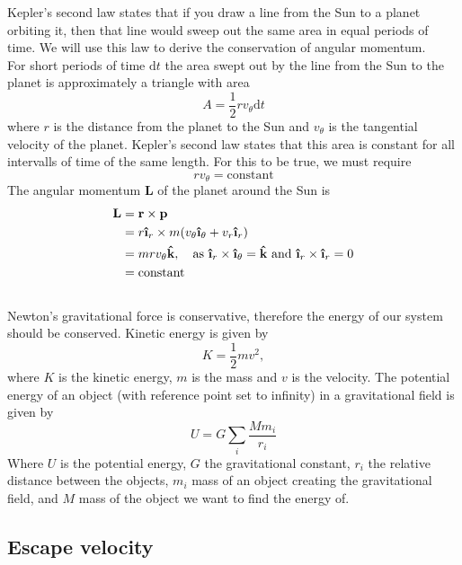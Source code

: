 \documentclass[reprint, english,notitlepage,nofootinbib]{revtex4-1}  %
\newcommand{\ihat}{\boldsymbol{\hat{\textbf{\i}}}}
\newcommand{\khat}{\boldsymbol{\hat{\textbf{k}}}}
\newcommand{\vc}[1]{\mathbf{#1}}
\begin{document}
Kepler's second law states that if you draw a line from the Sun to a planet orbiting it, then that line would sweep out the same area in equal periods of time. We will use this law to derive the conservation of angular momentum.
\\
For short periods of time $\mathrm d t$ the area swept out by the line from the Sun to the planet is approximately a triangle with area
\begin{equation*}
  A = \frac{1}{2} r v_\theta \mathrm dt
\end{equation*}
where $r$ is the distance from the planet to the Sun and $v_\theta$ is the tangential velocity of the planet. Kepler's second law states that this area is constant for all intervalls of time of the same length. For this to be true, we must require
\begin{equation*}
  r v_\theta = \text{constant}
\end{equation*}
The angular momentum $\vc L$ of the planet around the Sun is
\begin{align*}
  \vc L &= \vc r \times \vc p \\
  &= r \ihat_r \times m(v_\theta \ihat_\theta + v_r \ihat_r) \\
  &= m r v_\theta \khat, \quad \text{as } \ihat_r \times \ihat_\theta = \khat \text{ and } \ihat_r \times \ihat_r = 0 \\
  &= \text{constant}
\end{align*}
\\
Newton's gravitational force is conservative, therefore the energy of our system should be conserved. Kinetic energy is given by
\begin{equation}
\label{eq:kinetic_energy}
K = \frac{1}{2}mv^2,
\end{equation}
where $K$ is the kinetic energy, $m$ is the mass and $v$ is the velocity. The potential energy of an object (with reference point set to infinity) in a gravitational field is given by
\begin{equation}
\label{eq:potential_energy}
U = G\sum_{i}\frac{Mm_i}{r_i}
\end{equation}
Where $U$ is the potential energy, $G$ the gravitational constant, $r_i$ the relative distance between the objects, $m_i$ mass of an object creating the gravitational field, and $M$ mass of the object we want to find the energy of.

\subsection{Escape velocity}
\end{document}
